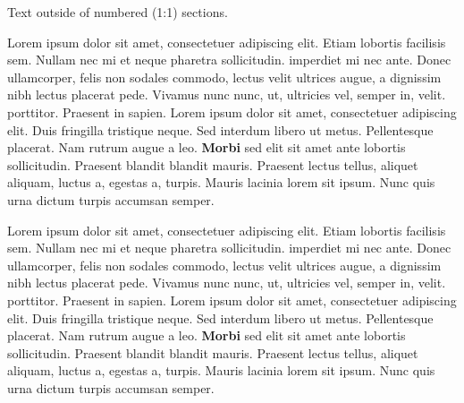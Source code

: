 \documentclass{memoir}
\begin{document}
\setcounter{page}{637}
Text outside of numbered (1:1) sections.
\begin{pairs}
\begin{Leftside}
\beginnumbering
\pstart
Lorem ipsum dolor sit amet, consectetuer adipiscing elit. Etiam
lobortis facilisis sem. Nullam nec mi et neque pharetra
sollicitudin.  imperdiet mi nec ante. Donec ullamcorper,
felis non sodales commodo, lectus velit ultrices augue, a
dignissim nibh lectus placerat pede. Vivamus nunc nunc, 
ut, ultricies vel, semper in, velit.  porttitor. Praesent in
sapien. Lorem ipsum dolor sit amet, consectetuer adipiscing elit.
Duis fringilla tristique neque. Sed interdum libero ut metus.
Pellentesque placerat. Nam rutrum augue a leo. \textbf{Morbi} sed elit sit
amet ante lobortis sollicitudin. Praesent blandit blandit mauris.
Praesent lectus tellus, aliquet aliquam, luctus a, egestas a,
turpis. Mauris lacinia lorem sit ipsum. Nunc quis urna dictum
turpis accumsan semper.
\pend
\endnumbering
\end{Leftside}
\begin{Rightside}
\beginnumbering
\pstart
Lorem ipsum dolor sit amet, consectetuer adipiscing elit. Etiam
lobortis facilisis sem. Nullam nec mi et neque pharetra
sollicitudin.  imperdiet mi nec ante. Donec ullamcorper,
felis non sodales commodo, lectus velit ultrices augue, a
dignissim nibh lectus placerat pede. Vivamus nunc nunc, 
ut, ultricies vel, semper in, velit.  porttitor. Praesent in
sapien. Lorem ipsum dolor sit amet, consectetuer adipiscing elit.
Duis fringilla tristique neque. Sed interdum libero ut metus.
Pellentesque placerat. Nam rutrum augue a leo. \textbf{Morbi} sed elit sit
amet ante lobortis sollicitudin. Praesent blandit blandit mauris.
Praesent lectus tellus, aliquet aliquam, luctus a, egestas a,
turpis. Mauris lacinia lorem sit ipsum. Nunc quis urna dictum
turpis accumsan semper.
\pend
\endnumbering
\end{Rightside}
\end{pairs}
\Columns
\printindex[test]
\end{document}
